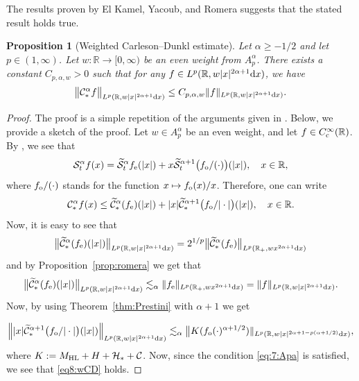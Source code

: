 \documentclass[11pt,oneside]{amsart}
\numberwithin{equation}{section}
\newtheorem{proposition}[equation]{Proposition}
\theoremstyle{definition}
\newcommand{\RR}{\mathbb{R}}
\newcommand{\calC}{\mathcal{C}}
\newcommand{\calH}{\mathcal{H}}
\newcommand{\calS}{\mathcal{S}}
\begin{document}
The results proven by El Kamel, Yacoub, and Romera suggests that the stated result holds true.
\begin{proposition}[Weighted Carleson--Dunkl estimate]\label{prop:WCD}
Let $\alpha\geq-1/2$ and let $p\in(1,\infty)$. Let $w\colon\RR\to[0,\infty)$ be an even weight from $A_p^\alpha$. There exists a constant $C_{p,\alpha,w}>0$ such that for any $f\in L^p(\mathbb{R},w|x|^{2\alpha+1}{\rm d}x)$, we have
\begin{equation}\label{eq8:wCD}
    \big\|{\calC}_{\ast}^\alpha f\big\|_{L^p(\RR,w|x|^{2\alpha+1}{\rm d}x)}\leq C_{p,\alpha,w}\|f\|_{L^p(\RR,w|x|^{2\alpha+1}{\rm d}x)}.
\end{equation}
\end{proposition}
\begin{proof}
The proof is a simple repetition of the arguments given in \cite{EKY}. Below, we provide a sketch of the proof. Let $w\in A_p^\alpha$ be an even weight, and let $f\in C_{\rm c}^\infty(\RR)$. By \cite[Lemma 2.1]{EKY}, we see that
\begin{equation*}
    {\calS}_{t}^\alpha f(x)=\widetilde{\calS}_{t}^\alpha f_{\rm e}(|x|)+x\widetilde{\calS}_{t}^{\alpha+1}\big(f_{\rm o}/{(\cdot)}\big)(|x|),\quad x\in\RR,
\end{equation*}
where $f_{\rm o}/{(\cdot)}$ stands for the function $x \mapsto f_{\rm o}(x) / x$. Therefore, one can write
\begin{equation}\label{eq:decomposition}
    {\calC}_{\ast}^\alpha f(x)\leq \widetilde{\calC}_{\ast}^\alpha(f_{\rm e})(|x|)+|x|\widetilde{\calC}_{\ast}^{\alpha+1}\big(f_{\rm o}/{|\cdot|}\big)(|x|),\quad x\in\RR.
\end{equation}
Now, it is easy to see that
\begin{equation*}
    \big\|\widetilde{\calC}_{\ast}^\alpha(f_{\rm e})(|x|)\big\|_{L^p(\RR,w|x|^{2\alpha+1}{\rm d}x)}=2^{1/p}\big\|\widetilde{\calC}_{\ast}^\alpha(f_{\rm e})\big\|_{L^p(\RR_+,wx^{2\alpha+1}{\rm d}x)}
\end{equation*}
and by Proposition~\ref{prop:romera} we get that
\begin{equation*}
    \big\|\widetilde{\calC}_{\ast}^\alpha(f_{\rm e})(|x|)\big\|_{L^p(\RR,w|x|^{2\alpha+1}{\rm d}x)}\lesssim_\alpha\|f_{\rm e}\|_{L^p(\RR_+,wx^{2\alpha+1}{\rm d}x)}=\|f\|_{L^p(\RR,w|x|^{2\alpha+1}{\rm d}x)}.
\end{equation*}
Now, by using Theorem~\ref{thm:Prestini} with $\alpha+1$ we get

\begin{equation*}
    \Big\||x|\widetilde{\calC}_{\ast}^{\alpha+1}\big(f_{\rm o}/{|\cdot|}\big)(|x|)\Big\|_{L^p(\RR,w|x|^{2\alpha+1}{\rm d}x)}\lesssim_\alpha\big\|K(f_{\rm o}(\cdot)^{\alpha+1/2})\|_{L^p(\RR,w|x|^{2\alpha+1-p(\alpha+1/2)}{\rm d}x)},
\end{equation*}
where $K:=M_{\rm HL}+H+\calH_\ast+\calC$. Now, since the condition \eqref{eq:7:Apa} is satisfied, we see that \eqref{eq8:wCD} holds.
\end{proof}
\end{document}
